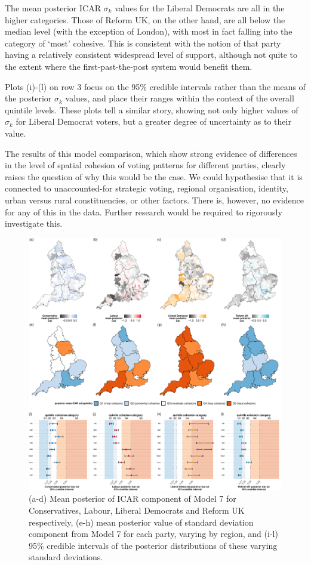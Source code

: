 \documentclass[webpdf,large,contemporary,namedate]{oup-authoring-template}
\theoremstyle{thmstyleone}
\theoremstyle{thmstyletwo}
\theoremstyle{thmstylethree}
\begin{document}
The mean posterior ICAR \(\sigma_k\) values for the Liberal Democrats
are all in the higher categories. Those of Reform UK, on the other hand,
are all below the median level (with the exception of London), with most
in fact falling into the category of `most' cohesive. This is consistent
with the notion of that party having a relatively consistent widespread
level of support, although not quite to the extent where the
first-past-the-post system would benefit them.

Plots (i)-(l) on row 3 focus on the 95\% credible intervals rather than
the means of the posterior \(\sigma_k\) values, and place their ranges
within the context of the overall quintile levels. These plots tell a
similar story, showing not only higher values of \(\sigma_k\) for
Liberal Democrat voters, but a greater degree of uncertainty as to their
value.

The results of this model comparison, which show strong evidence of
differences in the level of spatial cohesion of voting patterns for
different parties, clearly raises the question of why this would be the
case. We could hypothesise that it is connected to unaccounted-for
strategic voting, regional organisation, identity, urban versus rural
constituencies, or other factors. There is, however, no evidence for any
of this in the data. Further research would be required to rigorously
investigate this.

\begin{figure}[th]
\includegraphics[width=1\linewidth]{jrss_resubmission3_files/figure-latex/figspatialposts-1} \caption{(a-d) Mean posterior of ICAR component of Model 7 for Conservatives, Labour, Liberal Democrats and Reform UK respectively, (e-h) mean posterior value of standard deviation component from Model 7 for each party, varying by region, and (i-l) 95\% credible intervals of the posterior distributions of these varying standard deviations.}\label{fig:figspatialposts}
\end{figure}
\end{document}
